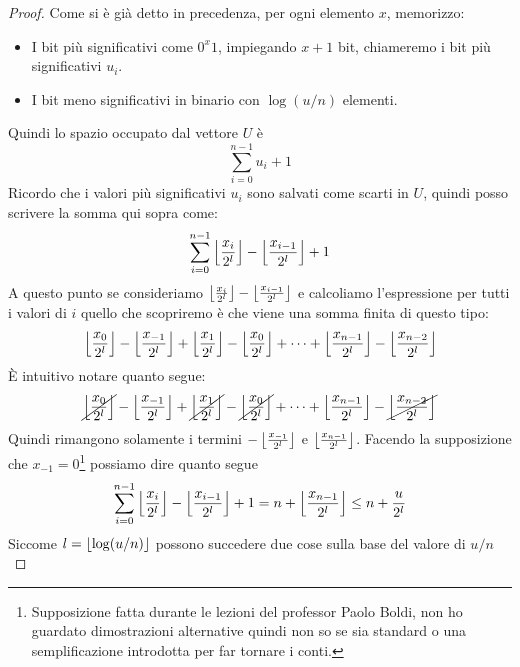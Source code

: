 \begin{proof}
    Come si è già detto in precedenza, per ogni elemento $x$, memorizzo:
    \begin{itemize}
        \item I bit più significativi come $0^x1$, impiegando $x + 1$ bit, chiameremo i bit più significativi $u_i$.
        \item I bit meno significativi in binario con $\log(u/n)$ elementi.
    \end{itemize}
    Quindi lo spazio occupato dal vettore $U$ è
    \begin{equation*}
        \sum_{i = 0}^{n - 1}{u_i + 1}
    \end{equation*}
    Ricordo che i valori più significativi $u_i$ sono salvati come scarti in $U$, quindi posso scrivere la somma qui sopra come:
    \begin{equation*}
        \sum_{i = 0}^{n - 1}{\left\lfloor \frac{x_i}{2^l} \right\rfloor - \left\lfloor \frac{x_{i - 1}}{2^l} \right\rfloor + 1}
    \end{equation*}
    A questo punto se consideriamo $\left\lfloor \frac{x_i}{2^l} \right\rfloor - \left\lfloor \frac{x_{i - 1}}{2^l} \right\rfloor$ e calcoliamo l'espressione per tutti i valori di $i$ quello che scopriremo è che viene una somma finita di questo tipo:
    \begin{equation*}
        \left\lfloor \frac{x_0}{2^l} \right\rfloor - \left\lfloor \frac{x_{- 1}}{2^l} \right\rfloor + \left\lfloor \frac{x_1}{2^l} \right\rfloor - \left\lfloor \frac{x_{0}}{2^l} \right\rfloor + \dots + \left\lfloor \frac{x_{n - 1}}{2^l} \right\rfloor - \left\lfloor \frac{x_{n - 2}}{2^l} \right\rfloor
    \end{equation*}
    È intuitivo notare quanto segue:
    \begin{equation*}
        \cancel{\left\lfloor \frac{x_0}{2^l} \right\rfloor} - \left\lfloor \frac{x_{- 1}}{2^l} \right\rfloor + \cancel{\left\lfloor \frac{x_1}{2^l} \right\rfloor} - \cancel{\left\lfloor \frac{x_{0}}{2^l} \right\rfloor} + \dots + \left\lfloor \frac{x_{n - 1}}{2^l} \right\rfloor - \cancel{\left\lfloor \frac{x_{n - 2}}{2^l} \right\rfloor}
    \end{equation*}
    Quindi rimangono solamente i termini $- \left\lfloor \frac{x_{- 1}}{2^l} \right\rfloor$ e $\left\lfloor \frac{x_{n - 1}}{2^l} \right\rfloor$. Facendo la supposizione che $x_{- 1} = 0$\footnote{Supposizione fatta durante le lezioni del professor Paolo Boldi, non ho guardato dimostrazioni alternative quindi non so se sia standard o una semplificazione introdotta per far tornare i conti.} possiamo dire quanto segue
    \begin{equation*}
        \sum_{i = 0}^{n - 1}{\left\lfloor \frac{x_i}{2^l} \right\rfloor - \left\lfloor \frac{x_{i - 1}}{2^l} \right\rfloor + 1} = n + \left\lfloor \frac{x_{n - 1}}{2^l} \right\rfloor \leq n + \frac{u}{2^l}
    \end{equation*}
    Siccome $l = \left\lfloor \log(u/n) \right\rfloor$ possono succedere due cose sulla base del valore di $u/n$

\end{proof}
